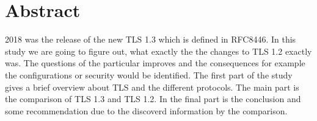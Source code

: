 \chapter*{Abstract}
\label{chap:abstract}

2018 was the release of the new TLS 1.3 which is defined in RFC8446. In this study we are going to figure out, what exactly  the 
the changes to TLS 1.2 exactly was. The questions of the particular improves and the consequences for example the configurations or security would be identified.
The first part of the study gives a brief overview about TLS and the different protocols. The main part is the comparison of TLS 1.3 and TLS 1.2.
In the final part is the conclusion and some recommendation due to the discoverd information by the comparison.


